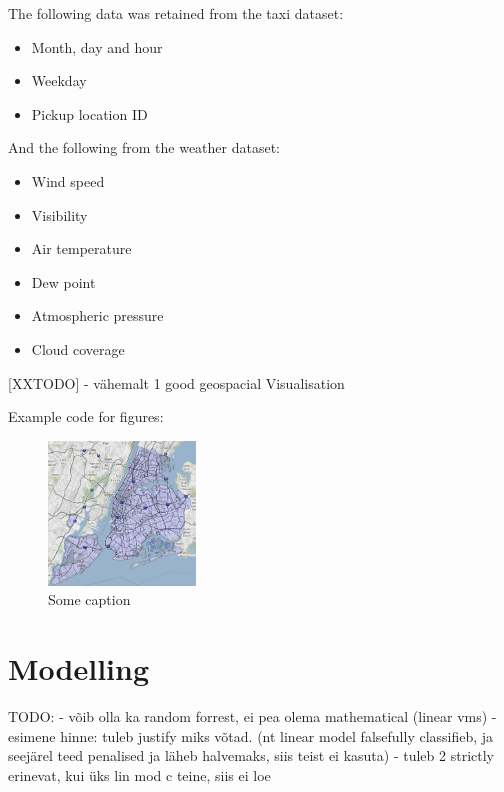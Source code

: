 \documentclass[11pt]{article}
\begin{document}
The following data was retained from the taxi dataset:
\begin{itemize}
    \item Month, day and hour
    \item Weekday
    \item Pickup location ID
\end{itemize}

And the following from the weather dataset:
\begin{itemize}
    \item Wind speed
    \item Visibility
    \item Air temperature
    \item Dew point
    \item Atmospheric pressure
    \item Cloud coverage
\end{itemize}

[XXTODO] - vähemalt 1 good geospacial Visualisation

Example code for figures:
\begin{figure}[h]
    \includegraphics[width=0.35\textwidth]{nyc_map.PNG}
    \centering
    \caption{Some caption} %
\end{figure}

\section{Modelling}
TODO:
    - võib olla ka random forrest, ei pea olema mathematical (linear vms)
    - esimene hinne: tuleb justify miks võtad. (nt linear model falsefully classifieb, ja seejärel teed penalised ja läheb halvemaks, siis teist ei kasuta)
        - tuleb 2 strictly erinevat, kui üks lin mod c teine, siis ei loe
\end{document}
